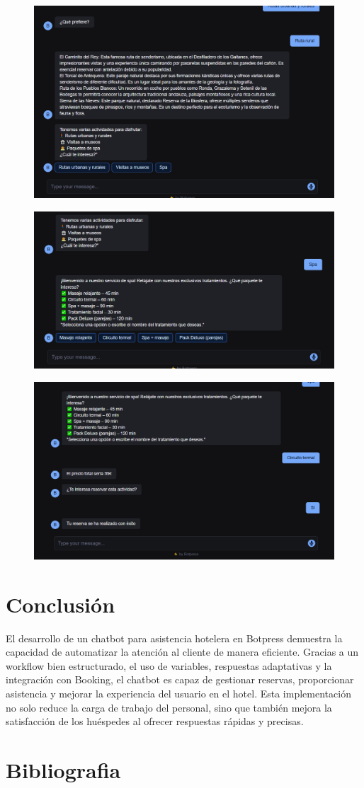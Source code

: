 \documentclass[12pt]{article}
\begin{document}
\begin{figure}[h!]
    \centering
    \includegraphics[width=.6\textwidth]{assets/ejemplo/conver-4.PNG}
    \label{fig:my_label}
\end{figure}

\begin{figure}[h!]
    \centering
    \includegraphics[width=.6\textwidth]{assets/ejemplo/conv-5.PNG}
    \label{fig:my_label}
\end{figure}

\begin{figure}[h!]
    \centering
    \includegraphics[width=.6\textwidth]{assets/ejemplo/conv-6.PNG}
    \label{fig:my_label}
\end{figure}

\clearpage

\section{Conclusión}

El desarrollo de un chatbot para asistencia hotelera en Botpress demuestra la capacidad de automatizar la atención al cliente de manera eficiente. 
Gracias a un workflow bien estructurado, el uso de variables, respuestas adaptativas y la integración con Booking, el chatbot es capaz de gestionar 
reservas, proporcionar asistencia y mejorar la experiencia del usuario en el hotel. Esta implementación no solo reduce la carga de trabajo del personal, 
sino que también mejora la satisfacción de los huéspedes al ofrecer respuestas rápidas y precisas.


\clearpage

\section{Bibliografia}

\cite{Botpress}

\printbibliography
\end{document}
